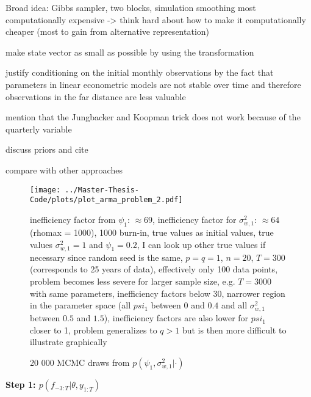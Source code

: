 Broad idea: Gibbs sampler, two blocks, simulation smoothing most computationally expensive -> think hard about how to make it computationally cheaper (most to gain from alternative representation)

make state vector as small as possible by using the transformation

justify conditioning on the initial monthly observations by the fact that parameters in linear econometric models are not stable over time and therefore observations in the far distance are less valuable

mention that the Jungbacker and Koopman trick does not work because of the quarterly variable

discuss priors and cite \citet{BaiWang2015}

compare with other approaches

\begin{figure}[tb]
	\texttt{[image: ../Master-Thesis-Code/plots/plot\_arma\_problem\_2.pdf]}
	\caption{20 000 MCMC draws from $p(\psi_1, \sigma^2_{w,1}|\cdot)$}
	\small inefficiency factor from $\psi_1$: $\approx 69$, inefficiency factor for $\sigma^2_{w,1}$: $\approx 64$ (rhomax = 1000), 1000 burn-in, true values as initial values, true values $\sigma^2_{w,1}=1$ and $\psi_1=0.2$, I can look up other true values if necessary since random seed is the same, $p=q=1$, $n=20$, $T=300$ (corresponds to 25 years of data), effectively only 100 data points, problem becomes less severe for larger sample size, e.g. $T=3000$ with same parameters, inefficiency factors below 30, narrower region in the parameter space (all $psi_1$ between $0$ and $0.4$ and all $\sigma^2_{w,1}$ between $0.5$ and $1.5$), inefficiency factors are also lower for $psi_1$ closer to 1, problem generalizes to $q>1$ but is then more difficult to illustrate graphically
	\label{fig:arma_problem}
\end{figure}

\textbf{Step 1: $p(f_{-3:T}|\theta, y_{1:T})$}

